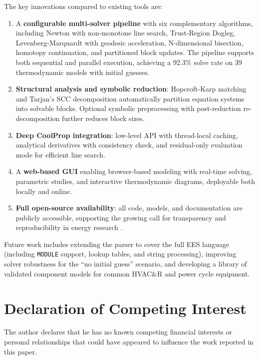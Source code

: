 \documentclass[review,3p]{elsarticle}
\begin{document}
The key innovations compared to existing tools are:
\begin{enumerate}
    \item A \textbf{configurable multi-solver pipeline} with six complementary algorithms, including Newton with non-monotone line search, Trust-Region Dogleg, Levenberg-Marquardt with geodesic acceleration, N-dimensional bisection, homotopy continuation, and partitioned block updates. The pipeline supports both sequential and parallel execution, achieving a 92.3\% solve rate on 39 thermodynamic models with initial guesses.
    \item \textbf{Structural analysis and symbolic reduction}: Hopcroft-Karp matching and Tarjan's SCC decomposition automatically partition equation systems into solvable blocks. Optional symbolic preprocessing with post-reduction re-decomposition further reduces block sizes.
    \item \textbf{Deep CoolProp integration}: low-level API with thread-local caching, analytical derivatives with consistency check, and residual-only evaluation mode for efficient line search.
    \item A \textbf{web-based GUI} enabling browser-based modeling with real-time solving, parametric studies, and interactive thermodynamic diagrams, deployable both locally and online.
    \item \textbf{Full open-source availability}: all code, models, and documentation are publicly accessible, supporting the growing call for transparency and reproducibility in energy research \cite{Pfenninger2017}.
\end{enumerate}

Future work includes extending the parser to cover the full EES language (including \texttt{MODULE} support, lookup tables, and string processing), improving solver robustness for the ``no initial guess'' scenario, and developing a library of validated component models for common HVAC\&R and power cycle equipment.


\section*{Declaration of Competing Interest}
The author declares that he has no known competing financial interests or personal relationships that could have appeared to influence the work reported in this paper.
\end{document}
